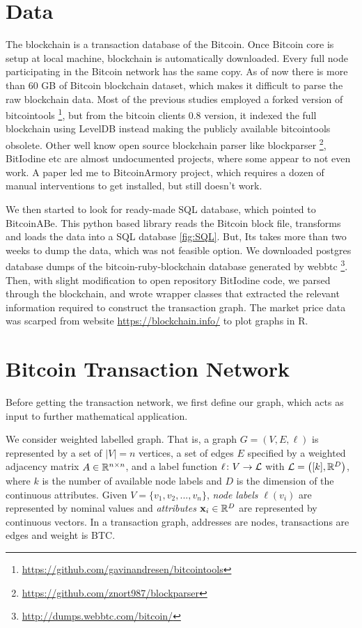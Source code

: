 \section{Data}
\label{data}
The blockchain is a transaction database of the Bitcoin.  Once Bitcoin core is setup at local machine, blockchain is automatically downloaded. Every full node participating in the Bitcoin network has the same copy. As of now there is more than 60 GB of Bitcoin blockchain dataset, which makes it difficult to parse the raw blockchain data. Most of the previous studies \citep{Ron2013} employed a forked version of bitcointools \footnote{\url{https://github.com/gavinandresen/bitcointools}}, but from the bitcoin clients 0.8 version, it indexed the full blockchain using LevelDB instead making the publicly available bitcointools obsolete. Other well know open source blockchain parser like blockparser \footnote{\url {https://github.com/znort987/blockparser}}, BitIodine \citep{Spagnuolo2013} etc are almost undocumented projects, where some appear to not even work. A paper \citep{Fleder2015} led me to BitcoinArmory project, which requires a dozen of manual interventions to get installed, but still doesn’t work.

We then started to look for ready-made SQL database, which pointed to BitcoinABe. This python based library reads the Bitcoin block file, transforms and loads the data into a SQL database \ref{fig:SQL}. But, Its takes more than two weeks to dump the data, which was not feasible option. We downloaded postgres database dumps of the bitcoin-ruby-blockchain database generated by webbtc \footnote{\url{http://dumps.webbtc.com/bitcoin/}}. Then, with slight modification to open repository BitIodine \citep{Spagnuolo2013} code, we parsed through the blockchain, and wrote wrapper classes that extracted the relevant information required to construct the transaction graph. The market price data was scarped from website \url {https://blockchain.info/} to plot graphs in R.

\section{Bitcoin Transaction Network}

Before getting the transaction network, we first define our graph, which acts as input to further mathematical application.

\begin{definition}
We consider weighted labelled graph. That is, a
graph $G=(V,E,\ell)$ is represented by a set of $|V|=n$ vertices, a
set of edges $E$ specified by a weighted adjacency matrix $A \in
\mathbb{R}^{n \times n}$, and a label function $\ell\colon V \rightarrow
\mathcal{L}$ with $\mathcal{L} = \left( [k], \mathbb{R}^D \right)$, where $k$ is the
number of available node labels and $D$ is the dimension of the
continuous attributes.  Given $V = \{v_1,v_2,...,v_n\}$, \emph{node
  labels} $\ell(v_i)$ are represented by nominal values and
\emph{attributes} $\mathbf{x}_i \in \mathbb{R}^D$ are represented by
continuous vectors. In a transaction graph, addresses are nodes, transactions are edges and weight is BTC.
\label{def:graph}
\end{definition}

